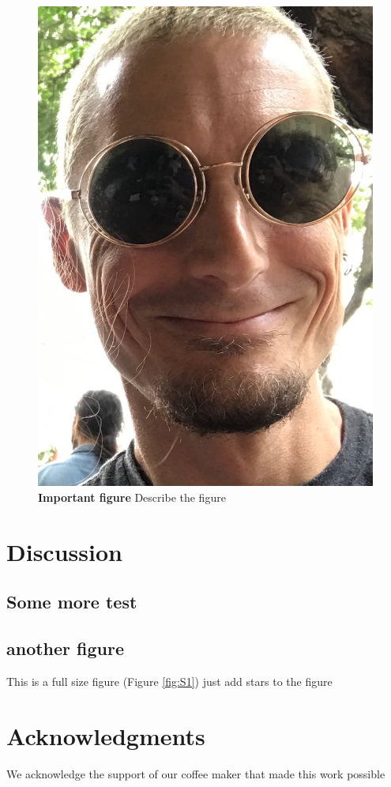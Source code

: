 \documentclass[9pt,twocolumn,twoside]{rilabRxiv}
\begin{document}
\begin{figure}[ht]
\includegraphics[width=0.6\linewidth]{figures/jri_bee.jpg}
\caption{\textbf{Important figure} Describe the figure }
\label{fig:figure1}
\end{figure}

\blindtext

\blindtext
\blindtext
\blindtext
\blindtext
\section{Discussion}
\subsection{Some more test}
\blindtext
\blindtext


\subsection{another figure}
This is a full size figure (Figure \ref{fig:S1}) just add stars to the figure


\section{Acknowledgments}
We acknowledge the support of our coffee maker that made this work possible


\end{document}
